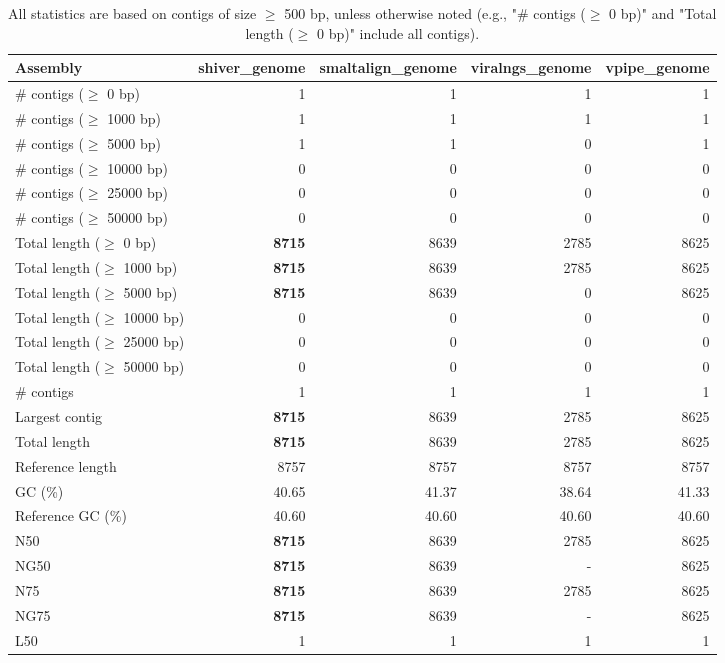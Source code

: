 \documentclass[12pt,a4paper]{article}
\begin{document}
\begin{table}[ht]
\begin{center}
\caption{All statistics are based on contigs of size $\geq$ 500 bp, unless otherwise noted (e.g., "\# contigs ($\geq$ 0 bp)" and "Total length ($\geq$ 0 bp)" include all contigs).}
\begin{tabular}{|l*{4}{|r}|}
\hline
Assembly & shiver\_genome & smaltalign\_genome & viralngs\_genome & vpipe\_genome \\ \hline
\# contigs ($\geq$ 0 bp) & 1 & 1 & 1 & 1 \\ \hline
\# contigs ($\geq$ 1000 bp) & 1 & 1 & 1 & 1 \\ \hline
\# contigs ($\geq$ 5000 bp) & 1 & 1 & 0 & 1 \\ \hline
\# contigs ($\geq$ 10000 bp) & 0 & 0 & 0 & 0 \\ \hline
\# contigs ($\geq$ 25000 bp) & 0 & 0 & 0 & 0 \\ \hline
\# contigs ($\geq$ 50000 bp) & 0 & 0 & 0 & 0 \\ \hline
Total length ($\geq$ 0 bp) & {\bf 8715} & 8639 & 2785 & 8625 \\ \hline
Total length ($\geq$ 1000 bp) & {\bf 8715} & 8639 & 2785 & 8625 \\ \hline
Total length ($\geq$ 5000 bp) & {\bf 8715} & 8639 & 0 & 8625 \\ \hline
Total length ($\geq$ 10000 bp) & 0 & 0 & 0 & 0 \\ \hline
Total length ($\geq$ 25000 bp) & 0 & 0 & 0 & 0 \\ \hline
Total length ($\geq$ 50000 bp) & 0 & 0 & 0 & 0 \\ \hline
\# contigs & 1 & 1 & 1 & 1 \\ \hline
Largest contig & {\bf 8715} & 8639 & 2785 & 8625 \\ \hline
Total length & {\bf 8715} & 8639 & 2785 & 8625 \\ \hline
Reference length & 8757 & 8757 & 8757 & 8757 \\ \hline
GC (\%) & 40.65 & 41.37 & 38.64 & 41.33 \\ \hline
Reference GC (\%) & 40.60 & 40.60 & 40.60 & 40.60 \\ \hline
N50 & {\bf 8715} & 8639 & 2785 & 8625 \\ \hline
NG50 & {\bf 8715} & 8639 & - & 8625 \\ \hline
N75 & {\bf 8715} & 8639 & 2785 & 8625 \\ \hline
NG75 & {\bf 8715} & 8639 & - & 8625 \\ \hline
L50 & 1 & 1 & 1 & 1 \\ \hline

\end{tabular}
\end{center}
\end{table}
\end{document}
